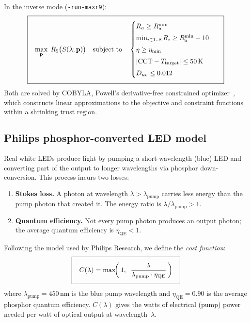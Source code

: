 \documentclass[11pt]{article}
\newcommand{\cmd}[1]{\texttt{#1}}
\begin{document}
\medskip\noindent
In the inverse mode (\cmd{-run-maxr9}):
\begin{equation}
\fboxsep=8pt
\boxed{\;
  \max_{\mathbf{p}} \; R_9\bigl(S(\lambda; \mathbf{p})\bigr)
  \quad \text{subject to} \quad
  \begin{cases}
    R_a \geq R_a^{\min} \\[3pt]
    \min_{i \in 1..8} R_i \geq R_a^{\min} - 10 \\[3pt]
    \eta \geq \eta_{\min} \\[3pt]
    |\text{CCT} - T_{\text{target}}| \leq 50\,\text{K} \\[3pt]
    D_{uv} \leq 0.012
  \end{cases}
\;}
  \label{eq:inverse}
\end{equation}
Both are solved by COBYLA, Powell's derivative-free constrained
optimizer~\cite{powell1994}, which constructs linear approximations
to the objective and constraint functions within a shrinking
trust region.

\subsection{Philips phosphor-converted LED model}
\label{sec:philips}

Real white LEDs produce light by pumping a short-wavelength (blue) LED
and converting part of the output to longer wavelengths via phosphor
down-conversion.  This process incurs two losses:
\begin{enumerate}
  \item \textbf{Stokes loss.}  A photon at wavelength $\lambda > \lambda_{\text{pump}}$
    carries less energy than the pump photon that created it.  The energy
    ratio is $\lambda / \lambda_{\text{pump}} > 1$.
  \item \textbf{Quantum efficiency.}  Not every pump photon produces an
    output photon; the average quantum efficiency is $\eta_{\text{QE}} < 1$.
\end{enumerate}

\noindent
Following the model used by Philips Research, we define the
\emph{cost function}:
\begin{equation}
\fboxsep=8pt
\boxed{\;
  C(\lambda) = \max\!\biggl(\, 1, \;\;
    \frac{\lambda}{\lambda_{\text{pump}} \cdot \eta_{\text{QE}}} \,\biggr)
\;}
  \label{eq:philips-cost}
\end{equation}
where $\lambda_{\text{pump}} = 450\,\text{nm}$ is the blue pump
wavelength and $\eta_{\text{QE}} = 0.90$ is the average phosphor
quantum efficiency.  $C(\lambda)$ gives the watts of electrical
(pump) power needed per watt of optical output at wavelength~$\lambda$.
\end{document}
